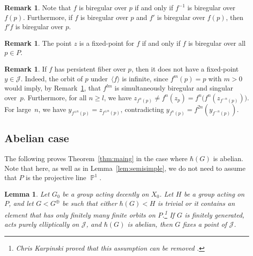\documentclass[JEP,XML,SOM,Unicode, NoEqCountersInSection,published]{cedram}
\newcommand{\p}{\operatorname{\mathbb{P}}}\let\P\p
\newcommand{\Jon}{\mathscr{J}}
\theoremstyle{plain}
\newtheorem{lemma}[theorem]{Lemma}
\theoremstyle{definition}
\newtheorem{remark}[theorem]{Remark}
\begin{document}
\begin{remark}
\label{rem:regular}
Note that $f$ is biregular over $p$ if and only if $f^{-1}$ is biregular over~$f(p)$. Furthermore, if $f$ is biregular over $p$ and $f'$ is biregular over $f(p)$, then $f'f$ is biregular over $p$.
\end{remark}

\begin{remark}
\label{rem:fixed}
The point $z$ is a fixed-point for $f$ if and only if $f$ is biregular over all $p\in P$.
\end{remark}

\begin{remark}
\label{rem:per}
If $f$ has persistent fiber over $p$, then it does not have a fixed-point $y\in \Jon$. Indeed, the orbit of $p$ under~$\langle f\rangle$ is infinite, since $f^m(p)=p$ with $m>0$ would imply, by Remark~\ref{rem:regular}, that $f^{l m}$ is simultaneously biregular and singular over~$p$. Furthermore, for all $n\geq l$, we have $z_{f^{n}(p)}\neq f^{n}(z_p)=f^n\big(f^n(z_{f^{-n}(p)})\big)$.
For large~$n$, we have $y_{f^{\pm n}(p)}=z_{f^{\pm n}(p)}$, contradicting $y_{f^{n}(p)}=f^{2n}(y_{f^{-n}(p)})$.
\end{remark}

\subsection{Abelian case}

The following proves Theorem~\ref{thm:maing} in the case where $\hbar(G)$ is abelian. Note that here, as well as in Lemma~\ref{lem:semisimple}, we do not need to assume that $P$ is the projective line $\p^1$.

\begin{lemma}
\label{lem:abel}
Let $G_0$ be a group acting decently on $X_0$. Let $H$ be a group acting on~$P$, and let $G<G^\oplus$ be such that either $\hbar(G)<H$ is trivial or it contains an element that has only finitely many finite orbits on $P$.\footnote{Chris Karpinski proved that this assumption can be removed \cite{Karpinski24}.} If $G$ is finitely generated, acts purely elliptically on $\Jon$, and $\hbar(G)$ is abelian, then $G$ fixes a point of $\Jon$.
\end{lemma}
\end{document}
